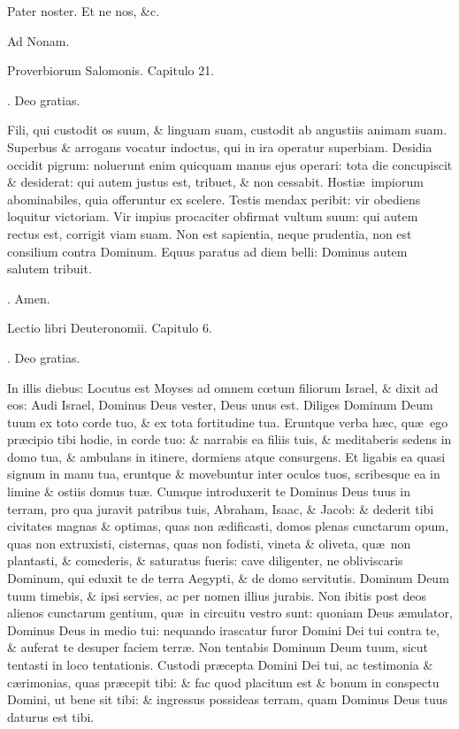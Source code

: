 \documentclass[letter,11pt]{book}
\makeatletter
\DeclareRobustCommand{\Rbar}{\vers@resp{0pt}{R}}
\newcommand{\vers@resp@sym}{\raisebox{0.2ex}{\rotatebox[origin=c]{-20}{$\m@th\rceil$}}}
\newcommand{\vers@resp}[2]{%
  {\ooalign{\hidewidth\kern#1\vers@resp@sym\hidewidth\cr#2\cr}}%
}%
\def\R{\color{Red} \Rbar . \color{black}}
\makeatother
\begin{document}
\begin{multicols*}{2}
Pater noster. Et ne nos, \&c.

Ad Nonam.

Proverbiorum Salomonis. Capitulo 21.

\R Deo gratias.

Fili, qui custodit os suum, \& linguam suam, custodit ab angustiis animam suam. Superbus \& arrogans vocatur indoctus, qui in ira operatur superbiam. Desidia occidit pigrum: noluerunt enim quicquam manus ejus operari: tota die concupiscit \& desiderat: qui autem justus est, tribuet, \& non cessabit. Hosti\ae \ impiorum abominabiles, quia offeruntur ex scelere. Testis mendax peribit: vir obediens loquitur victoriam. Vir impius procaciter obfirmat vultum suum: qui autem rectus est, corrigit viam suam. Non est sapientia, neque prudentia, non est consilium contra Dominum. Equus paratus ad diem belli: Dominus autem salutem tribuit.

\R Amen.

Lectio libri Deuteronomii. Capitulo 6.

\R Deo gratias.

In illis diebus: Locutus est Moyses ad omnem c\oe tum filiorum Israel, \& dixit ad eos: Audi Israel, Dominus Deus vester, Deus unus est. Diliges Dominum Deum tuum ex toto corde tuo, \& ex tota fortitudine tua. Eruntque verba h\ae c, qu\ae \ ego pr\ae cipio tibi hodie, in corde tuo: \& narrabis ea filiis tuis, \& meditaberis sedens in domo tua, \& ambulans in itinere, dormiens atque consurgens. Et ligabis ea quasi signum in manu tua, eruntque \& movebuntur inter oculos tuos, scribesque ea in limine \& ostiis domus tu\ae . Cumque introduxerit te Dominus Deus tuus in terram, pro qua juravit patribus tuis, Abraham, Isaac, \& Jacob: \& dederit tibi civitates magnas \& optimas, quas non \ae dificasti, domos plenas cunctarum opum, quas non extruxisti, cisternas, quas non fodisti, vineta \& oliveta, qu\ae \ non plantasti, \& comederis, \& saturatus fueris: cave diligenter, ne obliviscaris Dominum, qui eduxit te de terra Aegypti, \& de domo servitutis. Dominum Deum tuum timebis, \& ipsi servies, ac per nomen illius jurabis. Non ibitis post deos alienos cunctarum gentium, qu\ae \ in circuitu vestro sunt: quoniam Deus \ae mulator, Dominus Deus in medio tui: nequando irascatur furor Domini Dei tui contra te, \& auferat te desuper faciem terr\ae . Non tentabis Dominum Deum tuum, sicut tentasti in loco tentationis. Custodi pr\ae cepta Domini Dei tui, ac testimonia \& c\ae rimonias, quas pr\ae cepit tibi: \& fac quod placitum est \& bonum in conspectu Domini, ut bene sit tibi: \& ingressus possideas terram, quam Dominus Deus tuus daturus est tibi.


\end{multicols*}
\end{document}
